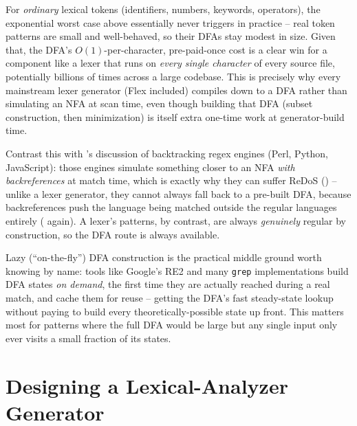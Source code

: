 \documentclass[full-course-notes.tex]{subfiles}
\begin{document}
\begin{coreidea}
For \emph{ordinary} lexical tokens (identifiers, numbers, keywords, operators), the exponential
worst case above essentially never triggers in practice -- real token patterns are small and
well-behaved, so their DFAs stay modest in size. Given that, the DFA's $O(1)$-per-character,
pre-paid-once cost is a clear win for a component like a lexer that runs on \emph{every single
character} of every source file, potentially billions of times across a large codebase. This is
precisely why every mainstream lexer generator (Flex included) compiles down to a DFA rather
than simulating an NFA at scan time, even though building that DFA (subset construction, then
minimization) is itself extra one-time work at generator-build time.
\end{coreidea}

\begin{examfocus}
Contrast this with 's discussion of backtracking regex engines
(Perl, Python, JavaScript): those engines simulate something closer to an NFA \emph{with
backreferences} at match time, which is exactly why they can suffer ReDoS
() -- unlike a lexer generator, they cannot always fall back to a
pre-built DFA, because backreferences push the language being matched outside the regular
languages entirely ( again). A lexer's patterns, by contrast, are
always \emph{genuinely} regular by construction, so the DFA route is always available.
\end{examfocus}

\begin{examfocus}
Lazy (``on-the-fly'') DFA construction is the practical middle ground worth knowing by name:
tools like Google's RE2 and many \texttt{grep} implementations build DFA states
\emph{on demand}, the first time they are actually reached during a real match, and cache them
for reuse -- getting the DFA's fast steady-state lookup without paying to build every
theoretically-possible state up front. This matters most for patterns where the full DFA would
be large but any single input only ever visits a small fraction of its states.
\end{examfocus}

\section{Designing a Lexical-Analyzer Generator}
\label{sec:l6-lexgen-design}
\end{document}
